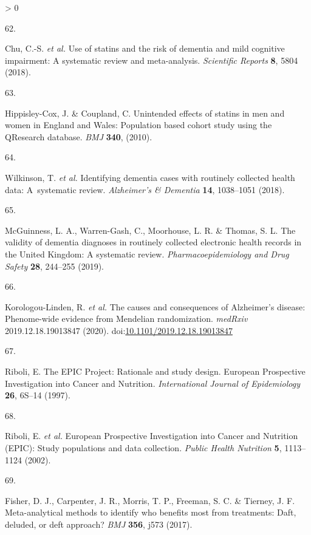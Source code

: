 \documentclass[a4paper, twoside]{templates/ociamthesis}
\newlength{\cslhangindent}
\newlength{\csllabelwidth}
\newenvironment{CSLReferences}[3] %
 {%
  \setlength{\parindent}{0pt}
  \ifodd #1 \everypar{\setlength{\hangindent}{\cslhangindent}}\ignorespaces\fi
  \ifnum #2 > 0
  \setlength{\parskip}{#2\baselineskip}
  \fi
 }%
 {}
\newcommand{\CSLLeftMargin}[1]{\parbox[t]{\maxof{\widthof{#1}}{\csllabelwidth}}{#1}}
\newcommand{\CSLRightInline}[1]{\parbox[t]{\linewidth - \csllabelwidth}{#1}}
\begin{document}
\begin{CSLReferences}{0}{0}
\leavevmode\hypertarget{ref-chu2018}{}%
\CSLLeftMargin{62. }
\CSLRightInline{Chu, C.-S. \emph{et al.} Use of statins and the risk of dementia and mild cognitive impairment: {A} systematic review and meta-analysis. \emph{Scientific Reports} \textbf{8}, 5804 (2018).}

\leavevmode\hypertarget{ref-hippisley-cox2010}{}%
\CSLLeftMargin{63. }
\CSLRightInline{Hippisley-Cox, J. \& Coupland, C. Unintended effects of statins in men and women in {England} and {Wales}: Population based cohort study using the {QResearch} database. \emph{BMJ} \textbf{340}, (2010).}

\leavevmode\hypertarget{ref-wilkinson2018}{}%
\CSLLeftMargin{64. }
\CSLRightInline{Wilkinson, T. \emph{et al.} Identifying dementia cases with routinely collected health data: {A}~systematic review. \emph{Alzheimer's \& Dementia} \textbf{14}, 1038--1051 (2018).}

\leavevmode\hypertarget{ref-mcguinness2019b}{}%
\CSLLeftMargin{65. }
\CSLRightInline{McGuinness, L. A., Warren-Gash, C., Moorhouse, L. R. \& Thomas, S. L. The validity of dementia diagnoses in routinely collected electronic health records in the {United Kingdom}: {A} systematic review. \emph{Pharmacoepidemiology and Drug Safety} \textbf{28}, 244--255 (2019).}

\leavevmode\hypertarget{ref-korologou-linden2020}{}%
\CSLLeftMargin{66. }
\CSLRightInline{Korologou-Linden, R. \emph{et al.} The causes and consequences of {Alzheimer}'s disease: Phenome-wide evidence from {Mendelian} randomization. \emph{medRxiv} 2019.12.18.19013847 (2020). doi:\href{https://doi.org/10.1101/2019.12.18.19013847}{10.1101/2019.12.18.19013847}}

\leavevmode\hypertarget{ref-riboli1997}{}%
\CSLLeftMargin{67. }
\CSLRightInline{Riboli, E. The {EPIC Project}: Rationale and study design. {European Prospective Investigation} into {Cancer} and {Nutrition}. \emph{International Journal of Epidemiology} \textbf{26}, 6S--14 (1997).}

\leavevmode\hypertarget{ref-riboli2002}{}%
\CSLLeftMargin{68. }
\CSLRightInline{Riboli, E. \emph{et al.} European {Prospective Investigation} into {Cancer} and {Nutrition} ({EPIC}): Study populations and data collection. \emph{Public Health Nutrition} \textbf{5}, 1113--1124 (2002).}

\leavevmode\hypertarget{ref-fisher2017}{}%
\CSLLeftMargin{69. }
\CSLRightInline{Fisher, D. J., Carpenter, J. R., Morris, T. P., Freeman, S. C. \& Tierney, J. F. Meta-analytical methods to identify who benefits most from treatments: Daft, deluded, or deft approach? \emph{BMJ} \textbf{356}, j573 (2017).}


\end{CSLReferences}
\end{document}

